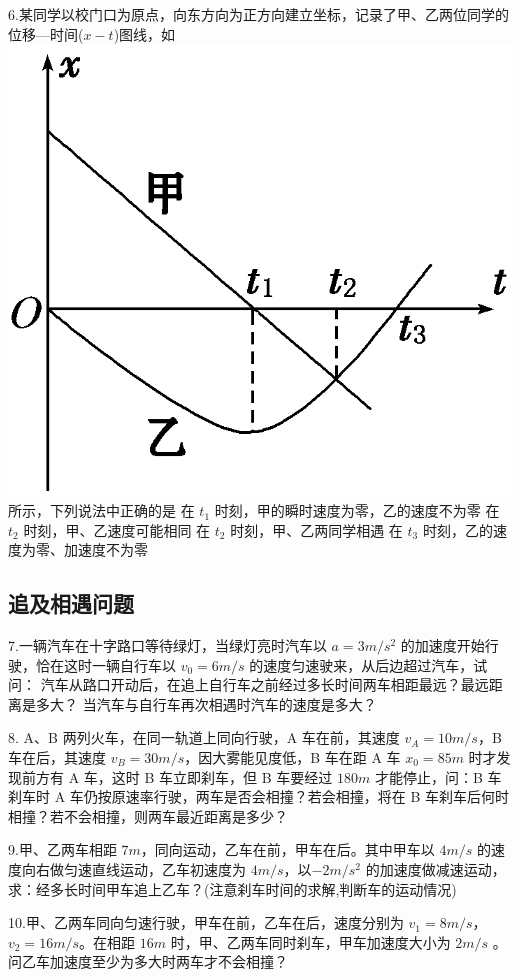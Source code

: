 \documentclass[a4paper,fontset = windows]{ctexbook} %
\begin{document}
\begin{xuanze}
6.某同学以校门口为原点，向东方向为正方向建立坐标，记录了甲、乙两位同学的位移—时间($x-t$)图线，如
\includegraphics{../picture/1-3/007.png} 
所示，下列说法中正确的是
\choice[A] 在 $t_1$ 时刻，甲的瞬时速度为零，乙的速度不为零
\choice[B] 在 $t_2$ 时刻，甲、乙速度可能相同
\choice[C] 在 $t_2$ 时刻，甲、乙两同学相遇
\choice[D] 在 $t_3$ 时刻，乙的速度为零、加速度不为零

\end{xuanze}

\subsection{追及相遇问题}

\begin{jisuan}
   7.一辆汽车在十字路口等待绿灯，当绿灯亮时汽车以 $a=3 m/s^2$ 的加速度开始行驶，恰在这时一辆自行车以 $v_0=6 m/s$ 的速度匀速驶来，从后边超过汽车，试问：
   \qitem 汽车从路口开动后，在追上自行车之前经过多长时间两车相距最远？最远距离是多大？
   \qitem 当汽车与自行车再次相遇时汽车的速度是多大？

   8. A、B 两列火车，在同一轨道上同向行驶，A 车在前，其速度 $v_A=10 m/s$，B 车在后，其速度 $v_B=30 m/s$，因大雾能见度低，B 车在距 A 车 $x_0=85 m$ 时才发现前方有 A 车，这时 B 车立即刹车，但 B 车要经过 $180 m$ 才能停止，问：B 车刹车时 A 车仍按原速率行驶，两车是否会相撞？若会相撞，将在 B 车刹车后何时相撞？若不会相撞，则两车最近距离是多少？

   9.甲、乙两车相距 $7 m$，同向运动，乙车在前，甲车在后。其中甲车以 $4 m/s$ 的速度向右做匀速直线运动，乙车初速度为 $4 m/s$，以$-2 m/s^2$ 的加速度做减速运动，求：经多长时间甲车追上乙车？(注意刹车时间的求解,判断车的运动情况)

10.甲、乙两车同向匀速行驶，甲车在前，乙车在后，速度分别为 $v_1=8 m/s$，$v_2=16m/s$。在相距 $16 m$ 时，甲、乙两车同时刹车，甲车加速度大小为 $2 m/s$ 。问乙车加速度至少为多大时两车才不会相撞？


\end{jisuan}
\end{document}
